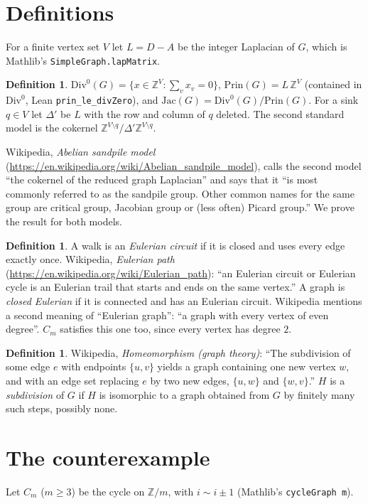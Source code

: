 \documentclass[11pt]{article}
\theoremstyle{definition}
\newtheorem{definition}[theorem]{Definition}
\begin{document}
\section{Definitions}
For a finite vertex set $V$ let $L=D-A$ be the integer Laplacian of $G$, which is Mathlib's
\texttt{SimpleGraph.lapMatrix}.
\begin{definition}
$\mathrm{Div}^0(G)=\{x\in\mathbb Z^V:\sum_v x_v=0\}$, $\mathrm{Prin}(G)=L\,\mathbb Z^V$
(contained in $\mathrm{Div}^0$, Lean \texttt{prin\_le\_divZero}), and
$\mathrm{Jac}(G)=\mathrm{Div}^0(G)/\mathrm{Prin}(G)$.
For a sink $q\in V$ let $\Delta'$ be $L$ with the row and column of $q$ deleted. The second standard
model is the cokernel $\mathbb Z^{V\setminus q}/\Delta'\mathbb Z^{V\setminus q}$.
\end{definition}
Wikipedia, \emph{Abelian sandpile model} (\url{https://en.wikipedia.org/wiki/Abelian_sandpile_model}),
calls the second model ``the cokernel of the reduced graph Laplacian'' and says that it ``is most
commonly referred to as the sandpile group. Other common names for the same group are critical
group, Jacobian group or (less often) Picard group.'' We prove the result for both models.

\begin{definition}
A walk is an \emph{Eulerian circuit} if it is closed and uses every edge exactly once. Wikipedia,
\emph{Eulerian path} (\url{https://en.wikipedia.org/wiki/Eulerian_path}): ``an Eulerian circuit or
Eulerian cycle is an Eulerian trail that starts and ends on the same vertex.'' A graph is
\emph{closed Eulerian} if it is connected and has an Eulerian circuit. Wikipedia mentions a second
meaning of ``Eulerian graph'': ``a graph with every vertex of even degree''. $C_m$ satisfies this
one too, since every vertex has degree $2$.
\end{definition}

\begin{definition}
Wikipedia, \emph{Homeomorphism (graph theory)}: ``The subdivision of some edge $e$ with endpoints
$\{u,v\}$ yields a graph containing one new vertex $w$, and with an edge set replacing $e$ by two
new edges, $\{u,w\}$ and $\{w,v\}$.'' $H$ is a \emph{subdivision} of $G$ if $H$ is isomorphic to a
graph obtained from $G$ by finitely many such steps, possibly none.
\end{definition}

\section{The counterexample}
Let $C_m$ ($m\ge 3$) be the cycle on $\mathbb Z/m$, with $i\sim i\pm1$ (Mathlib's \texttt{cycleGraph m}).
\end{document}
